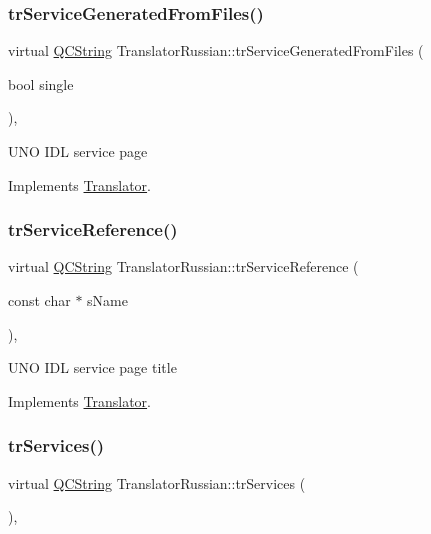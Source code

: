 \subsubsection{\texorpdfstring{trServiceGeneratedFromFiles()}{trServiceGeneratedFromFiles()}}
{\footnotesize\ttfamily virtual \mbox{\hyperlink{class_q_c_string}{Q\+C\+String}} Translator\+Russian\+::tr\+Service\+Generated\+From\+Files (\begin{DoxyParamCaption}\item[{bool}]{single }\end{DoxyParamCaption})\hspace{0.3cm}{\ttfamily [inline]}, {\ttfamily [virtual]}}

U\+NO I\+DL service page 

Implements \mbox{\hyperlink{class_translator}{Translator}}.

\mbox{\label{class_translator_russian_a4fb3cb28ef4e4a98da09e81358a4bb5c}} 
\subsubsection{\texorpdfstring{trServiceReference()}{trServiceReference()}}
{\footnotesize\ttfamily virtual \mbox{\hyperlink{class_q_c_string}{Q\+C\+String}} Translator\+Russian\+::tr\+Service\+Reference (\begin{DoxyParamCaption}\item[{const char $\ast$}]{s\+Name }\end{DoxyParamCaption})\hspace{0.3cm}{\ttfamily [inline]}, {\ttfamily [virtual]}}

U\+NO I\+DL service page title 

Implements \mbox{\hyperlink{class_translator}{Translator}}.

\mbox{\label{class_translator_russian_a1dad34f13b6a455a408439d53dc1aff7}} 
\subsubsection{\texorpdfstring{trServices()}{trServices()}}
{\footnotesize\ttfamily virtual \mbox{\hyperlink{class_q_c_string}{Q\+C\+String}} Translator\+Russian\+::tr\+Services (\begin{DoxyParamCaption}{ }\end{DoxyParamCaption})\hspace{0.3cm}{\ttfamily [inline]}, {\ttfamily [virtual]}}

